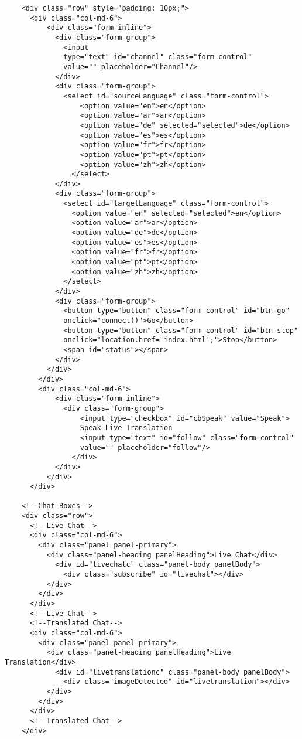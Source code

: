 \documentclass[runningheads]{llncs}
\begin{document}
{\begin{verbatim}
    <div class="row" style="padding: 10px;">
      <div class="col-md-6">
          <div class="form-inline">
            <div class="form-group">
              <input 
              type="text" id="channel" class="form-control" 
              value="" placeholder="Channel"/>
            </div>
            <div class="form-group">
              <select id="sourceLanguage" class="form-control">
                  <option value="en">en</option>
                  <option value="ar">ar</option>
                  <option value="de" selected="selected">de</option>
                  <option value="es">es</option>
                  <option value="fr">fr</option>
                  <option value="pt">pt</option>
                  <option value="zh">zh</option>
                </select>
            </div>
            <div class="form-group">
              <select id="targetLanguage" class="form-control">
                <option value="en" selected="selected">en</option>
                <option value="ar">ar</option>
                <option value="de">de</option>
                <option value="es">es</option>
                <option value="fr">fr</option>
                <option value="pt">pt</option>
                <option value="zh">zh</option>
              </select>
            </div>
            <div class="form-group">
              <button type="button" class="form-control" id="btn-go" 
              onclick="connect()">Go</button>
              <button type="button" class="form-control" id="btn-stop"
              onclick="location.href='index.html';">Stop</button>
              <span id="status"></span>
            </div>
          </div>
        </div>
        <div class="col-md-6">
            <div class="form-inline">
              <div class="form-group">
                  <input type="checkbox" id="cbSpeak" value="Speak"> 
                  Speak Live Translation
                  <input type="text" id="follow" class="form-control" 
                  value="" placeholder="follow"/>
                </div>
            </div>
          </div>
      </div>

    <!--Chat Boxes-->
    <div class="row">
      <!--Live Chat-->
      <div class="col-md-6">
        <div class="panel panel-primary">
          <div class="panel-heading panelHeading">Live Chat</div>
            <div id="livechatc" class="panel-body panelBody">
              <div class="subscribe" id="livechat"></div>
          </div>
        </div>
      </div>
      <!--Live Chat-->
      <!--Translated Chat-->
      <div class="col-md-6">
        <div class="panel panel-primary">
          <div class="panel-heading panelHeading">Live Translation</div>
            <div id="livetranslationc" class="panel-body panelBody">
              <div class="imageDetected" id="livetranslation"></div>
          </div>
        </div>
      </div>
      <!--Translated Chat-->
    </div>


\end{verbatim}}
\end{document}
